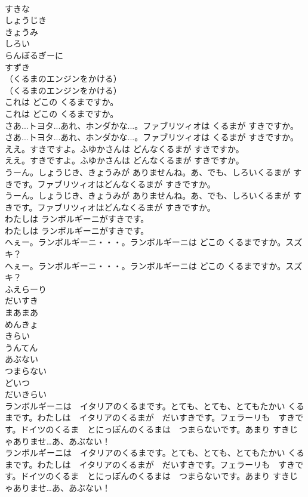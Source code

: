 \documentclass[8pt]{extreport}
\begin{document}
\begin{CJK}{UTF8}{min}
\\	すきな
\\	しょうじき
\\	きょうみ
\\	しろい
\\	らんぼるぎーに
\\	すずき
\\	（くるまのエンジンをかける）	
\\	（くるまのエンジンをかける） 
\\	これは どこの くるまですか。	
\\	これは どこの くるまですか。 
\\	さあ...トヨタ...あれ、ホンダかな...。ファブリツィオは くるまが すきですか。	
\\	さあ...トヨタ...あれ、ホンダかな...。ファブリツィオは くるまが すきですか。 
\\	ええ。すきですよ。ふゆかさんは どんなくるまが すきですか。	
\\	ええ。すきですよ。ふゆかさんは どんなくるまが すきですか。 
\\	うーん。しょうじき、きょうみが ありませんね。あ、でも、しろいくるまが すきです。ファブリツィオはどんなくるまが すきですか。	
\\	うーん。しょうじき、きょうみが ありませんね。あ、でも、しろいくるまが すきです。ファブリツィオはどんなくるまが すきですか。 
\\	わたしは ランボルギーニがすきです。	
\\	わたしは ランボルギーニがすきです。 
\\	へぇー。ランボルギーニ・・・。ランボルギーニは どこの くるまですか。スズキ？	
\\	へぇー。ランボルギーニ・・・。ランボルギーニは どこの くるまですか。スズキ？ 
\\	ふえらーり
\\	だいすき
\\	まあまあ
\\	めんきょ
\\	きらい
\\	うんてん
\\	あぶない
\\	つまらない
\\	どいつ
\\	だいきらい
\\	ランボルギーニは　イタリアのくるまです。とても、とても、とてもたかい くるまです。わたしは　イタリアのくるまが　だいすきです。フェラーリも　すきです。ドイツのくるま　とにっぽんのくるまは　つまらないです。あまり すきじゃありませ…あ、あぶない！	
\\	ランボルギーニは　イタリアのくるまです。とても、とても、とてもたかい くるまです。わたしは　イタリアのくるまが　だいすきです。フェラーリも　すきです。ドイツのくるま　とにっぽんのくるまは　つまらないです。あまり すきじゃありませ…あ、あぶない！ 

\end{CJK}
\end{document}
